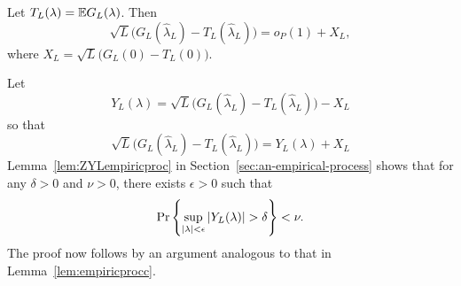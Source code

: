\documentclass[journal]{IEEEtran}
\begin{document}
\begin{lemma}\label{lem:empiricprocforrho} Let $T_L(\lambda) = {\mathbb E} G_L(\lambda)$.  Then
\[
\sqrt{L}\big( G_L(\hat{\lambda}_L) - T_L(\hat{\lambda}_L) \big) = o_P(1) + X_L,
\]
where $X_L = \sqrt{L} \big( G_L(0) - T_L(0) \big)$.
\end{lemma}
\begin{IEEEproof}
Let
\begin{equation}\label{eq:YLdef}
Y_L(\lambda) = \sqrt{L}\big( G_L(\hat{\lambda}_L) - T_L(\hat{\lambda}_L) \big) - X_L
\end{equation}
so that
\[
\sqrt{L}\big( G_L(\hat{\lambda}_L) - T_L(\hat{\lambda}_L) \big) = Y_L(\lambda) + X_L
\]
Lemma~\ref{lem:ZYLempiricproc} in Section~\ref{sec:an-empirical-process} shows that for any $\delta > 0$ and $\nu > 0$, there exists $\epsilon > 0$ such that
\[
\Pr\left\{ \sup_{{\vert \lambda \vert}<\epsilon}{\vert Y_L(\lambda) \vert} > \delta  \right\} < \nu.
\]
The proof now follows by an argument analogous to that in Lemma~\ref{lem:empiricprocc}.
\end{IEEEproof}
\end{document}
